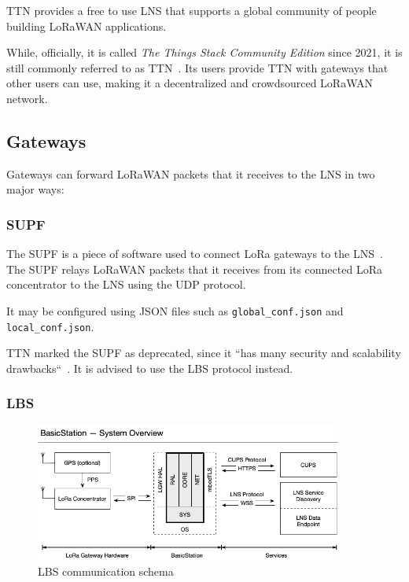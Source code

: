 \ac{TTN} provides a free to use \ac{LNS} that supports a global community of people building \ac{LoRaWAN} applications.

While, officially, it is called \emph{The Things Stack Community Edition} since 2021, it is still commonly referred to as \acf{TTN}~\cite{the_things_industries_bv_what_2022}.
Its users provide \ac{TTN} with gateways that other users can use, making it a decentralized and crowdsourced \ac{LoRaWAN} network.

\subsection{Gateways}

Gateways can forward \ac{LoRaWAN} packets that it receives to the \ac{LNS} in two major ways:

\subsubsection{\acf{SUPF}}

The \acl{SUPF} is a piece of software used to connect \ac{LoRa} gateways to the \ac{LNS}~\cite{the_things_industries_bv_semtech_2022}.
The \ac{SUPF} relays \ac{LoRaWAN} packets that it receives from its connected \ac{LoRa} concentrator to the \ac{LNS} using the \ac{UDP} protocol.

It may be configured using JSON files such as \lstinline{global_conf.json} and \lstinline{local_conf.json}.

\ac{TTN} marked the \acl{SUPF} as deprecated, since it ``has many security and scalability drawbacks``~\cite{the_things_industries_bv_semtech_2022}.
It is advised to use the \acl{LBS} protocol instead.

\subsubsection{\acf{LBS}}

\begin{figure}[h]
    \centering
    \includegraphics[width=0.9\textwidth]{pictures/lorawan-structure/lora-basics-station-structure.png}
    \caption{\acf{LBS} communication schema~\protect\cite{semtech_lora_developer_portal_lora_2022}}\label{pic:lora-basics-station-schema}
\end{figure}

